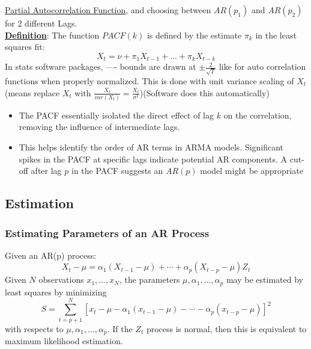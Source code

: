 \underline{Partial Autocorrelation Function}, and choosing between $AR(p_1)$ and $AR(p_2)$ for 2 different Lags. \\

\textbf{\underline{Definition}}: \quad The function $PACF(k)$ is defined by the estimate $\pi_k$ in the least squares fit: \[
X_t=\nu +\pi_1 X_{t-1} +...+ \pi_k X_{t-k}
\]
In stats software packages, ---- bounds are drawn at $\pm \frac{2}{\sqrt{T}}$ like for auto correlation functions when properly normalized. This is done with unit variance scaling of $X_t$ (means replace $X_t$ with $\frac{X_t}{var(X_t)}=\frac{X_t}{\sigma^2}$)(Software does this automatically)

\begin{itemize}
    \item The PACF essentially isolated the direct effect of lag $k$ on the correlation, removing the influence of intermediate lags.
    \item This helps identify the order of AR terms in ARMA models. Significant spikes in the PACF at specific lags indicate potential AR components. A cut-off after lag $p$ in the PACF suggests an $AR(p)$ model might be appropriate
\end{itemize}

\subsection{Estimation}

\subsubsection{Estimating Parameters of an AR Process}

Given an AR(p) process: \[
X_t -\mu = \alpha_1(X_{t-1}-\mu) + \cdots + \alpha_p (X_{t-p} -\mu) Z_t
\] Given $N$ observations $x_1, \ldots, x_N$, the parameters $\mu, \alpha_1, \ldots, \alpha_p$ may be estimated by least squares by minimizing\[
S = \sum_{t=p+1}^N \left[x_t-\mu-\alpha_1(x_{t-1}-\mu) - \cdots - \alpha_p (x_{t-p}-\mu) \right]^2
\] with respects to $\mu, \alpha_1, \ldots, \alpha_p$. If the $Z_t$ process is normal, then this is equivalent to maximum likelihood estimation. \\

